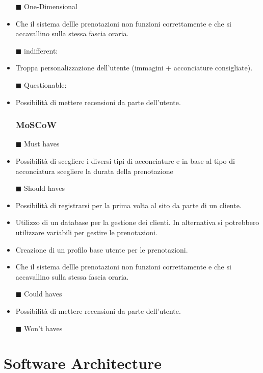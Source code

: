 \documentclass{article}
\begin{document}
\begin{itemize}
\begin{itemize}
\item[$\blacksquare$] {One-Dimensional}
    \item Che il sistema dellle prenotazioni non funzioni correttamente 
    e che si accavallino sulla stessa fascia oraria.

\item[$\blacksquare$] {indifferent:}
    \item Troppa personalizzazione dell'utente (immagini + acconciature consigliate).

\item[$\blacksquare$] {Questionable:}
    \item Possibilità di mettere recensioni da parte dell'utente.

\subsubsection{MoSCoW}

\item[$\blacksquare$] {Must haves}
    \item Possibilità di scegliere i diversi tipi di acconciature e in 
    base al tipo di acconciatura scegliere la durata della prenotazione 

\item[$\blacksquare$] {Should haves}
    \item Possibilità di registrarsi per la prima volta al sito da parte di un cliente.
    \item Utilizzo di un database per la gestione dei clienti. In alternativa si potrebbero utilizzare 
    variabili per gestire le prenotazioni.
    \item Creazione di un profilo base utente per le prenotazioni.
    \item Che il sistema dellle prenotazioni non funzioni correttamente 
    e che si accavallino sulla stessa fascia oraria.

\item[$\blacksquare$] {Could haves}
    \item Possibilità di mettere recensioni da parte dell'utente.

\item[$\blacksquare$] {Won't haves}
\end{itemize}
\newpage 
\section{Software Architecture}

\end{itemize}
\end{document}
